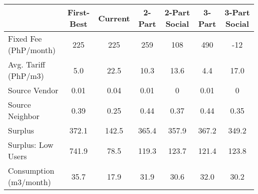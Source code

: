 \begin{tabular}{lcccccc}
  & First-Best & Current & 2-Part  & 2-Part Social  & 3-Part & 3-Part Social \\
\hline
Fixed Fee (PhP/month) &225&225&259&108&490&-12\\
Avg. Tariff (PhP/m3) &5.0&22.5&10.3&13.6&4.4&17.0\\
Source Vendor & 0.01 &0.04 &0.01 &0 &0.01 &0\\
Source Neighbor &0.39 &0.25 &0.44 &0.37 &0.44 &0.35 \\
Surplus &372.1&142.5&365.4&357.9&367.2&349.2\\
Surplus: Low Users &741.9&78.5&119.3&123.7&121.4&123.8\\
Consumption (m3/month) &35.7&17.9&31.9&30.6&32.0&30.2\\
\hline
\end{tabular}
